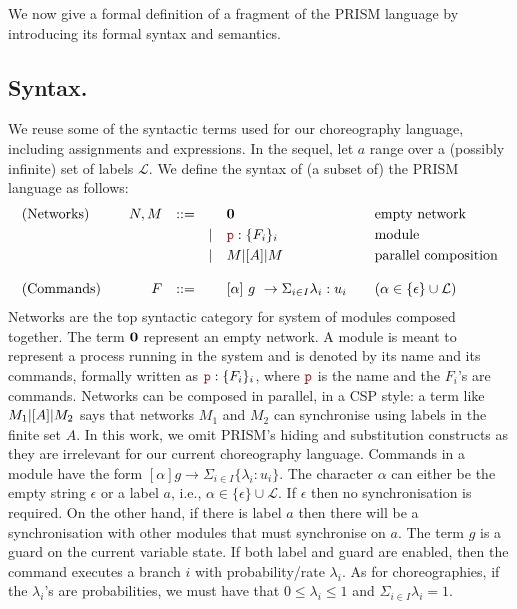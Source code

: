 We now give a formal definition of a fragment of the PRISM language by
introducing its formal syntax and semantics.

\subsection{Syntax.} We reuse some of the syntactic terms used for our
choreography language, including assignments and expressions. In the
sequel, let $a$ range over a (possibly infinite) set of labels
$\mathcal L$. We define the syntax of (a subset of) the PRISM language
as follows:
\begin{displaymath}
  \begin{array}{lrlll@{\qquad}l}
    \text{(Networks)}  \quad
    & N, M  & ::=  &      & \CEnd & \text{empty network}\\[1mm]
    &       &      & \mid & \role{p}:\{F_i\}_i & \text{module}\\[1mm]
    &       &      & \mid & M \ppp A M & \text{parallel composition}\\
    \\
    \text{(Commands)}  \quad
    & F     & ::=  &      & \command \alpha g\lambda u
                                  & \text{} (\alpha\in\{\epsilon\}\cup\mathcal L) \\
  \end{array}
\end{displaymath}
Networks are the top syntactic category for system of modules composed
together. The term $\mathbf{0}$ represent an empty network. A module is
meant to represent a process running in the system and is denoted by
its name and its commands, formally written as $\role{p}:\{F_i\}_i$,
where $\role p$ is the name and the $F_i$'s are commands. Networks can
be composed in parallel, in a CSP style: a term like $M_1 |[A]| M_2$
says that networks $M_1$ and $M_2$ can synchronise using labels in the
finite set $A$.
In this work, we omit PRISM's hiding and substitution constructs as
they are irrelevant for our current choreography language.
Commands in a module have the form
$[\alpha] g \rightarrow \Sigma_{i\in I}\{\lambda_i: u_i\}$. The
character $\alpha$ can either be the empty string $\epsilon$ or a
label $a$, i.e., $\alpha\in\{\epsilon\}\cup \mathcal L$. If $\epsilon$
then no synchronisation is required. On the other hand, if there is
label $a$ then there will be a synchronisation with other modules that
must synchronise on $a$. The term $g$ is a guard on the current
variable state. If both label and guard are enabled, then the command
executes a branch $i$ with probability/rate $\lambda_i$. As for
choreographies, if the $\lambda_i$'s are probabilities, we must have
that $0\leq\lambda_i\leq 1$ and $\Sigma_{i\in I}\lambda_i=1$.

